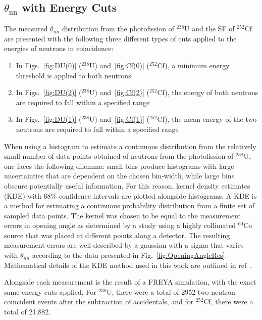 \subsection{$\theta_{\text{nn}}$ with Energy Cuts}
The measured $\theta_{nn}$ distribution from the photofission of $^{238}$U and the SF of $^{252}$Cf are presented with the following three different types of cuts applied to the energies of neutrons in coincidence:
\begin{enumerate}[label=(\roman*), itemjoin={{, }}, itemjoin*={{, or }}]
    \item In Figs.~\ref{fig:DU(0)} ($^{238}$U) and~\ref{fig:Cf(0)} ($^{252}$Cf), a minimum energy threshold is applied to both neutrons
    \item In Figs.~\ref{fig:DU(2)} ($^{238}$U) and~\ref{fig:Cf(2)} ($^{252}$Cf), the energy of both neutrons are required to fall within a specified range
  \item In Figs.~\ref{fig:DU(1)} ($^{238}$U) and~\ref{fig:Cf(1)} ($^{252}$Cf), the mean energy of the two neutrons are required to fall within a specified range
 \end{enumerate}

When using a histogram to estimate a continuous distribution from the relatively small number of data points obtained of neutrons from the photofission of $^{238}$U, one faces the following dilemma: small bins produce histograms with large uncertainties that are dependent on the chosen bin-width, while large bins obscure potentially useful information. 
For this reason, kernel density estimates (KDE) with 68\% confidence intervals are plotted alongside histograms.
A KDE is a method for estimating a continuous probability distribution from a finite set of sampled data points.
The kernel was chosen to be equal to the measurement errors in opening angle as determined by a study using a highly collimated $^{60}$Co source that was placed at different points along a detector.
The resulting measurement errors are well-described by a gaussian with a sigma that varies with $\theta_{nn}$ according to the data presented in Fig.~\ref{fig:OpeningAngleRes}.
Mathematical details of the KDE method used in this work are outlined in ref~\cite{KDE}. 

Alongside each measurement is the result of a FREYA simulation, with the exact same energy cuts applied.
For $^{238}$U, there were a total of 2952 two-neutron coincident events after the subtraction of accidentals, and for $^{252}$Cf, there were a total of 21,882.

